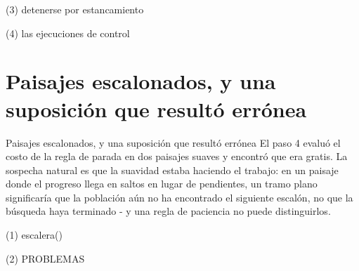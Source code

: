 \begin{frame}[fragile]{(3) detenerse por estancamiento}

\end{frame}

\begin{frame}[fragile]{(4) las ejecuciones de control}

\end{frame}


\section{Paisajes escalonados, y una suposición que resultó errónea}

\begin{frame}{Paisajes escalonados, y una suposición que resultó errónea}
El paso 4 evaluó el costo de la regla de parada en dos paisajes suaves y encontró que era gratis. La
sospecha natural es que la suavidad estaba haciendo el trabajo: en un paisaje donde el
progreso llega en saltos en lugar de pendientes, un tramo plano significaría que la
población aún no ha encontrado el siguiente escalón, no que la búsqueda haya terminado - y una
regla de paciencia no puede distinguirlos.
\end{frame}

\begin{frame}[fragile]{(1) escalera()}

\end{frame}

\begin{frame}[fragile]{(2) PROBLEMAS}

\end{frame}


